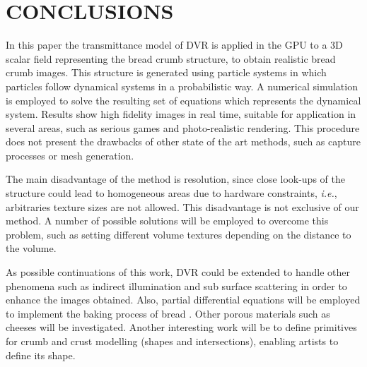 \documentclass[oneside,a4paper,english,links]{amca}
\begin{document}



\section{CONCLUSIONS}

In this paper the transmittance model of DVR is applied in the GPU to a 3D scalar field representing the bread crumb structure, to obtain realistic bread crumb images. This structure is generated using particle systems in which particles follow dynamical systems in a probabilistic way. A numerical simulation is employed to solve the resulting set of equations which represents the dynamical system. Results show high fidelity images in real time, suitable for application in several areas, such as serious games \citep{Susi2007} and photo-realistic rendering. This procedure does not present the drawbacks of other state of the art methods, such as capture processes or mesh generation.

The main disadvantage of the method is resolution, since close look-ups of the structure could lead to homogeneous areas due to hardware constraints, {\em i.e.}, arbitraries texture sizes are not allowed. This disadvantage is not exclusive of our method. A number of possible solutions will be employed to overcome this problem, such as setting different volume textures depending on the distance to the volume. 

As possible continuations of this work, DVR could be extended to handle other phenomena such as indirect illumination and sub surface scattering in order to enhance the images obtained. Also, partial differential equations will be employed to implement the baking process of bread \citep{Purlis2012}. Other porous materials such as cheeses will be investigated. Another interesting work will be to define primitives for crumb and crust modelling (shapes and intersections), enabling artists to define its shape.

%

\end{document}
